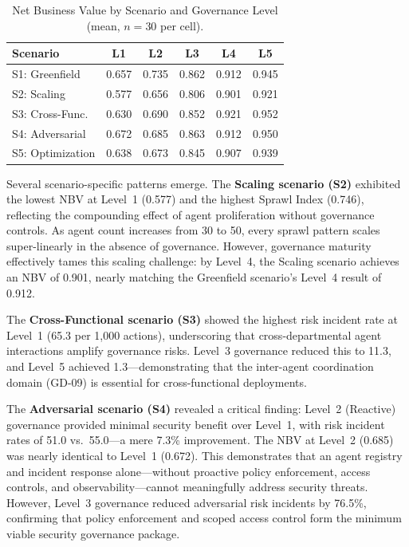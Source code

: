 \documentclass[ai,article,submit,pdftex,moreauthors]{Definitions/mdpi}
\begin{document}
\begin{table}[htbp]
\caption{Net Business Value by Scenario and Governance Level (mean, $n = 30$ per cell).}\label{tab:scenario-nbv}
\centering
\small
\begin{tabular}{l c c c c c}
\toprule
\textbf{Scenario} & \textbf{L1} & \textbf{L2} & \textbf{L3} & \textbf{L4} & \textbf{L5} \\
\midrule
S1: Greenfield     & 0.657 & 0.735 & 0.862 & 0.912 & 0.945 \\
S2: Scaling        & 0.577 & 0.656 & 0.806 & 0.901 & 0.921 \\
S3: Cross-Func.    & 0.630 & 0.690 & 0.852 & 0.921 & 0.952 \\
S4: Adversarial    & 0.672 & 0.685 & 0.863 & 0.912 & 0.950 \\
S5: Optimization   & 0.638 & 0.673 & 0.845 & 0.907 & 0.939 \\
\bottomrule
\end{tabular}
\end{table}

Several scenario-specific patterns emerge. The \textbf{Scaling scenario (S2)} exhibited the lowest NBV at Level~1 (0.577) and the highest Sprawl Index (0.746), reflecting the compounding effect of agent proliferation without governance controls. As agent count increases from 30 to 50, every sprawl pattern scales super-linearly in the absence of governance. However, governance maturity effectively tames this scaling challenge: by Level~4, the Scaling scenario achieves an NBV of 0.901, nearly matching the Greenfield scenario's Level~4 result of 0.912.

The \textbf{Cross-Functional scenario (S3)} showed the highest risk incident rate at Level~1 (65.3 per 1{,}000 actions), underscoring that cross-departmental agent interactions amplify governance risks. Level~3 governance reduced this to 11.3, and Level~5 achieved 1.3---demonstrating that the inter-agent coordination domain (GD-09) is essential for cross-functional deployments.

The \textbf{Adversarial scenario (S4)} revealed a critical finding: Level~2 (Reactive) governance provided minimal security benefit over Level~1, with risk incident rates of 51.0 vs.\ 55.0---a mere 7.3\% improvement. The NBV at Level~2 (0.685) was nearly identical to Level~1 (0.672). This demonstrates that an agent registry and incident response alone---without proactive policy enforcement, access controls, and observability---cannot meaningfully address security threats. However, Level~3 governance reduced adversarial risk incidents by 76.5\%, confirming that policy enforcement and scoped access control form the minimum viable security governance package.
\end{document}
